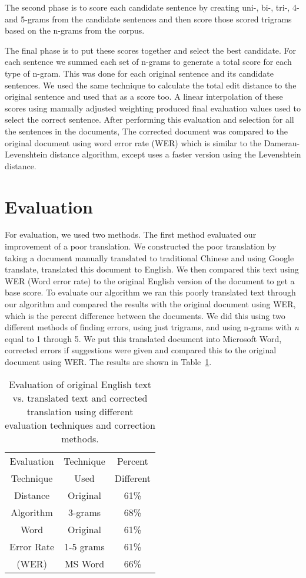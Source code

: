 \documentclass[twocolumn]{article}
\begin{document}
The second phase is to score each candidate sentence by creating uni-, bi-,
tri-, 4- and 5-grams from the candidate sentences and then score those scored
trigrams based on the n-grams from the corpus.

The final phase is to put these scores together and select the best candidate.
For each sentence we summed each set of n-grams to generate a total score for
each type of n-gram. This was done for each original sentence and its candidate
sentences. We used the same technique to calculate the total edit distance to
the original sentence and used that as a score too. A linear interpolation of
these scores using manually adjusted weighting produced final evaluation values
used to select the correct sentence. After performing this evaluation and
selection for all the sentences in the documents, The corrected document was
compared to the original document using word error rate (WER) which is similar to the Damerau-Levenshtein distance algorithm, except uses a faster version using the Levenshtein distance.

\section{Evaluation}
For evaluation, we used two methods. The first method evaluated our improvement
of a poor translation. We constructed the poor translation by taking a document
manually translated to traditional Chinese and using Google translate,
translated this document to English. We then compared this text using WER (Word
error rate) to the original English version of the document to get a base score.
To evaluate our algorithm we ran this poorly translated text through our
algorithm and compared the results with the original document using WER, which
is the percent difference between the documents. We did this using two different
methods of finding errors, using just trigrams, and using n-grams with \textit{n} equal
to 1 through 5. We put this translated document into Microsoft Word, corrected
errors if suggestions were given and compared this to the original document
using WER. The results are shown in Table~\ref{gpl}.

\begin{table}[h]
\centering
\begin{tabular}{ | c | c | c | }
\hline
Evaluation & Technique & Percent \\
Technique & Used & Different \\
\hline
Distance & Original & 61\% \\
\cline{2-3} Algorithm & 3-grams & 68\% \\
\hline
Word & Original & 61\% \\
\cline{2-3} Error Rate & 1-5 grams & 61\% \\
\cline{2-3} (WER) & MS Word & 66\% \\
\hline
\end{tabular}
\caption{Evaluation of original English text vs. translated text and corrected translation using different evaluation techniques and correction methods.}
\label{gpl}
\end{table}
\end{document}
